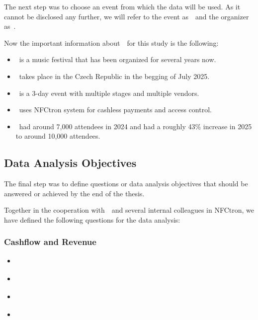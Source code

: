 The next step was to choose an event from which the data will be used.
As it cannot be disclosed any further, we will refer to the event as~\theEvent~and the organizer as~\theOrganizer.

Now the important information about~\theEvent~for this study is the following:
\begin{itemize}
	\item \theEvent~is a music festival that has been organized for several years now.
	\item \theEvent~takes place in the Czech Republic in the begging of July 2025.
	\item \theEvent~is a 3-day event with multiple stages and multiple vendors.
	\item \theEvent~uses NFCtron system for cashless payments and access control.
	\item \theEvent~had around 7,000 attendees in 2024 and had a roughly 43\% increase in 2025 to around 10,000 attendees.
\end{itemize}

\subsection*{Data Analysis Objectives}
\label{subsec:introduction-objectives-data-analysis}

The final step was to define questions or data analysis objectives that should be answered or achieved by the end of the thesis.

Together in the cooperation with~\theOrganizer~and several internal colleagues in NFCtron, we have defined the following questions for the data analysis:

\subsubsection*{Cashflow and Revenue}
\begin{itemize}
	\item \textit{}
	\item \textit{}
	\item \textit{}
	\item \textit{}
\end{itemize}


